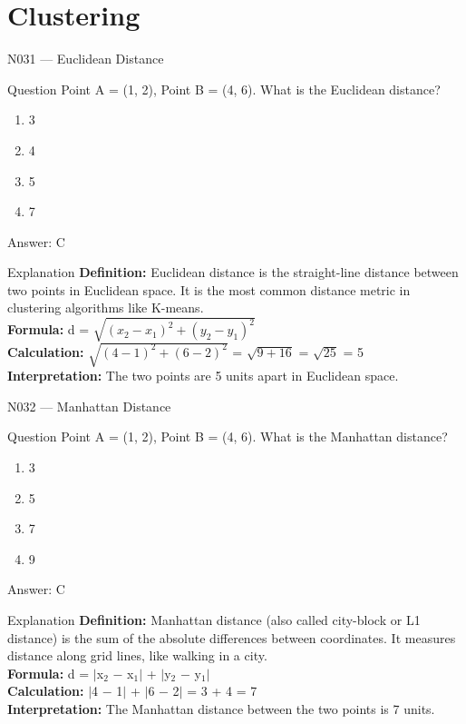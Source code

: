 \documentclass[aspectratio=169,8pt]{beamer}
\begin{document}
	\section{Clustering}
	
	\begin{frame}{N031 --- Euclidean Distance}
		\begin{block}{Question}
			Point A = (1, 2), Point B = (4, 6). What is the Euclidean distance?
			\begin{enumerate}
				\item 3
				\item 4
				\item 5
				\item 7
			\end{enumerate}
		\end{block}
		\begin{exampleblock}{Answer: C}\end{exampleblock}
		\begin{block}{Explanation}
			\textbf{Definition:} Euclidean distance is the straight-line distance between two points in Euclidean space. It is the most common distance metric in clustering algorithms like K-means.\\
			\textbf{Formula:} d = $\sqrt{(x_{2}-x_{1})^{2} + (y_{2}-y_{1})^{2}}$\\
			\textbf{Calculation:} $\sqrt{(4-1)^{2} + (6-2)^{2}}$ = $\sqrt{9+16}$ = $\sqrt{25}$ = 5\\
			\textbf{Interpretation:} The two points are 5 units apart in Euclidean space.
		\end{block}
	\end{frame}
	
	\begin{frame}{N032 --- Manhattan Distance}
		\begin{block}{Question}
			Point A = (1, 2), Point B = (4, 6). What is the Manhattan distance?
			\begin{enumerate}
				\item 3
				\item 5
				\item 7
				\item 9
			\end{enumerate}
		\end{block}
		\begin{exampleblock}{Answer: C}\end{exampleblock}
		\begin{block}{Explanation}
			\textbf{Definition:} Manhattan distance (also called city-block or L1 distance) is the sum of the absolute differences between coordinates. It measures distance along grid lines, like walking in a city.\\
			\textbf{Formula:} d = $|$x$_{2}$ $-$ x$_{1}$$|$ + $|$y$_{2}$ $-$ y$_{1}$$|$\\
			\textbf{Calculation:} $|$4 $-$ 1$|$ + $|$6 $-$ 2$|$ = 3 + 4 = 7\\
			\textbf{Interpretation:} The Manhattan distance between the two points is 7 units.
		\end{block}
	\end{frame}
	
\end{document}
